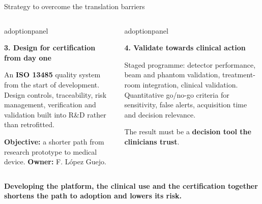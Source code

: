 \documentclass[aspectratio=169,11pt]{beamer}
\begin{document}
\begin{frame}{Strategy to overcome the translation barriers}
\begin{columns}[T,onlytextwidth]
\begin{beamercolorbox}[sep=6pt,wd=\linewidth]{adoptionpanel}
\begin{minipage}[t][2.45cm][t]{\linewidth}\raggedright
{\footnotesize\bfseries\color{crBlue}3. Design for certification from day one\par}
\vspace{0.07cm}
{\scriptsize An \textbf{ISO 13485} quality system from the start of development. Design controls, traceability, risk management, verification and validation built into R\&D rather than retrofitted.\par\vspace{0.06cm}
\textbf{Objective:} a shorter path from research prototype to medical device. \textbf{Owner:} F. L\'opez Guejo.\par}
\end{minipage}
\end{beamercolorbox}
\begin{beamercolorbox}[sep=6pt,wd=\linewidth]{adoptionpanel}
\begin{minipage}[t][2.45cm][t]{\linewidth}\raggedright
{\footnotesize\bfseries\color{crBlue}4. Validate towards clinical action\par}
\vspace{0.07cm}
{\scriptsize Staged programme: detector performance, beam and phantom validation, treatment-room integration, clinical validation. Quantitative go/no-go criteria for sensitivity, false alerts, acquisition time and decision relevance.\par\vspace{0.06cm}
The result must be a \textbf{decision tool the clinicians trust}.\par}
\end{minipage}
\end{beamercolorbox}
\end{columns}
\vspace{0.08cm}
{\footnotesize\bfseries\color{darkred}Developing the platform, the clinical use and the certification together shortens the path to adoption and lowers its risk.\par}
\end{frame}
\end{document}
